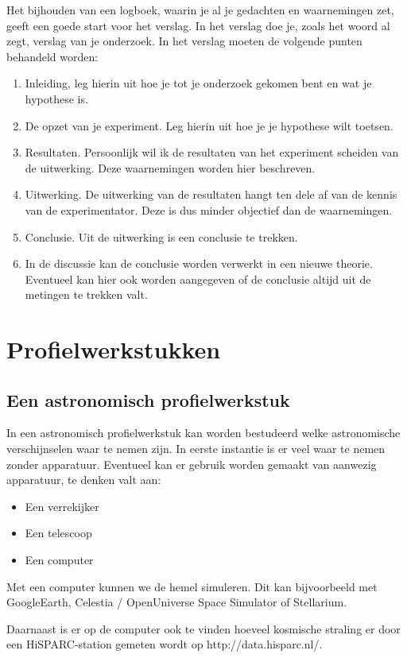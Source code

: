 Het bijhouden van een logboek, waarin je al je gedachten en waarnemingen
zet, geeft een goede start voor het verslag. In het verslag doe je,
zoals het woord al zegt, verslag van je onderzoek. In het verslag
moeten de volgende punten behandeld worden:
\begin{enumerate}
\item Inleiding, leg hierin uit hoe je tot je onderzoek gekomen bent en
wat je hypothese is.
\item De opzet van je experiment. Leg hierin uit hoe je je hypothese wilt
toetsen.
\item Resultaten. Persoonlijk wil ik de resultaten van het experiment scheiden
van de uitwerking. Deze waarnemingen worden hier beschreven.
\item Uitwerking. De uitwerking van de resultaten hangt ten dele af van
de kennis van de experimentator. Deze is dus minder objectief dan
de waarnemingen.
\item Conclusie. Uit de uitwerking is een conclusie te trekken.
\item In de discussie kan de conclusie worden verwerkt in een nieuwe theorie.
Eventueel kan hier ook worden aangegeven of de conclusie altijd uit
de metingen te trekken valt.
\end{enumerate}

\section{Profielwerkstukken}


\subsection{Een astronomisch profielwerkstuk}

In een astronomisch profielwerkstuk kan worden bestudeerd welke astronomische
verschijnselen waar te nemen zijn. In eerste instantie is er veel
waar te nemen zonder apparatuur. Eventueel kan er gebruik worden gemaakt
van aanwezig apparatuur, te denken valt aan:
\begin{itemize}
\item Een verrekijker
\item Een telescoop
\item Een computer
\end{itemize}
Met een computer kunnen we de hemel simuleren. Dit kan bijvoorbeeld
met GoogleEarth, Celestia / OpenUniverse Space Simulator of Stellarium.

Daarnaast is er op de computer ook te vinden hoeveel kosmische straling
er door een HiSPARC-station gemeten wordt op http://data.hisparc.nl/.


